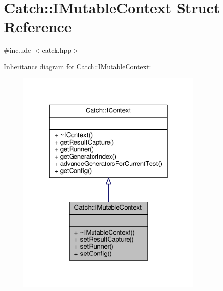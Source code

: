 \hypertarget{struct_catch_1_1_i_mutable_context}{\section{Catch\-:\-:I\-Mutable\-Context Struct Reference}
\label{struct_catch_1_1_i_mutable_context}
}


{\ttfamily \#include $<$catch.\-hpp$>$}



Inheritance diagram for Catch\-:\-:I\-Mutable\-Context\-:
\nopagebreak
\begin{figure}[H]
\begin{center}
\leavevmode
\includegraphics[width=262pt]{struct_catch_1_1_i_mutable_context__inherit__graph}
\end{center}
\end{figure}


